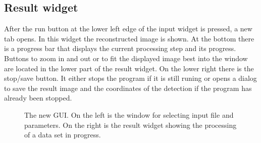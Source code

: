 \subsection{Result widget}
After the run button at the lower left edge of the input widget is pressed, a new tab opens. In this widget the reconstructed image is shown. At the bottom there is a progress bar that displays the current processing step and its progress. Buttons to zoom in and out or to fit the displayed image best into the window are located in the lower part of the result widget. On the lower right there is the stop/save button. It either stops the program if it is still runing or opens a dialog to save the result image and the coordinates of the detection if the program has already been stopped.

\begin{figure}
\hfill
{}
	\caption{The new GUI. On the left is the window for selecting input file and parameters. On the right is the result widget showing the processing of a data set in progress.}
	\label{guiWidgets}	
\end{figure}

